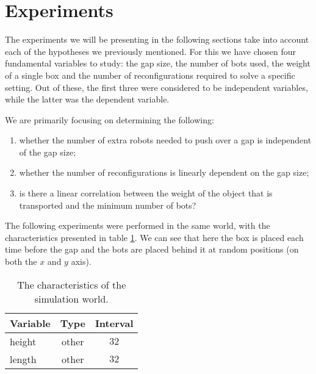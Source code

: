 \section{Experiments}
\label{sec:exp}

The experiments we will be presenting in the following sections take into account each of the hypotheses we previously mentioned. For this we have chosen four fundamental variables to study: the gap size, the number of bots used, the weight of a single box and the number of reconfigurations required to solve a specific setting. Out of these, the first three were considered to be independent variables, while the latter was the dependent variable. 

We are primarily focusing on determining the following:
\begin{enumerate}
 \item whether the number of extra robots needed to push over a gap is independent of the gap size;
 \item whether the number of reconfigurations is linearly dependent on the gap size;
 \item is there a linear correlation between the weight of the object that is transported and the minimum number of bots?
\end{enumerate}

The following experiments were performed in the same world, with the characteristics presented in table \ref{tbl:world}. We can see that here the box is placed each time before the gap and the bots are placed behind it at random positions (on both the $x$ and $y$ axis). 

\begin{table}
 \caption{The characteristics of the simulation world.}
 \begin{center}
  \begin{tabular}{| p{5cm} | c | c |}
   \hline
   \centering \textbf{Variable} & \textbf{Type} & \textbf{Interval} \\ \hline
   height & other & $32$ \\ \hline
   length & other & $32$ \\ \hline
  \end{tabular}
 \end{center}
 \label{tbl:world}
\end{table}




